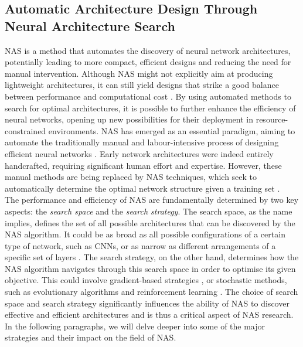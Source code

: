 
\subsection{Automatic Architecture Design Through Neural Architecture Search}\label{sec:sota:nas}

\acf{NAS} is a method that automates the discovery of neural network
architectures, potentially leading to more compact, efficient designs and
reducing the need for manual intervention. Although \ac{NAS} might not
explicitly aim at producing lightweight architectures, it can still yield
designs that strike a good balance between performance and computational cost
\cite{DBLP:conf/cvpr/TanCPVSHL19,DBLP:conf/icml/TanL19}. By using automated
methods to search for optimal architectures, it is possible to further enhance
the efficiency of neural networks, opening up new possibilities for their
deployment in resource-constrained environments. \ac{NAS} has emerged as an
essential paradigm, aiming to automate the traditionally manual and
labour-intensive process of designing efficient neural networks
\cite{DBLP:journals/corr/MiikkulainenLMR17}. Early network architectures were
indeed entirely handcrafted, requiring significant human effort and expertise.
However, these manual methods are being replaced by \ac{NAS} techniques, which
seek to automatically determine the optimal network structure given a training
set \cite{DBLP:journals/corr/abs-2301-08727,elsken2019neural}.\\

The performance and efficiency of \ac{NAS} are fundamentally determined by two
key aspects: the \emph{search space} and the \emph{search strategy}. The search
space, as the name implies, defines the set of all possible architectures that
can be discovered by the \ac{NAS} algorithm. It could be as broad as all
possible configurations of a certain type of network, such as \acp{CNN}, or as
narrow as different arrangements of a specific set of layers
\cite{DBLP:conf/cvpr/LiuCSAHY019}. The search strategy, on the other hand,
determines how the \ac{NAS} algorithm navigates through this search space in
order to optimise its given objective. This could involve gradient-based
strategies \cite{DBLP:conf/iclr/LiuSY19,DBLP:conf/iclr/XuX0CQ0X20}, or
stochastic methods, such as evolutionary algorithms and reinforcement learning
\cite{DBLP:conf/iclr/ZophL17,DBLP:conf/icml/RealMSSSTLK17}. The choice of search
space and search strategy significantly influences the ability of \ac{NAS} to
discover effective and efficient architectures and is thus a critical aspect of
NAS research. In the following paragraphs, we will delve deeper into some of the
major strategies and their impact on the field of \ac{NAS}.\\



